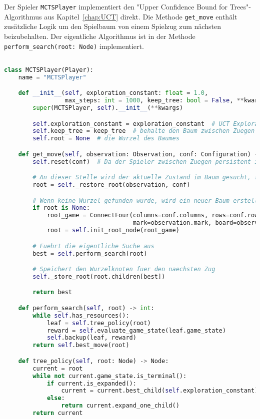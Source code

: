 Der Spieler \verb|MCTSPlayer| implementiert den "Upper Confidence Bound for Trees"-Algorithmus aus Kapitel~\ref{chap:UCT} direkt.
Die Methode \verb|get_move| enthält zusätzliche Logik um den Spielbaum von einem Spielzug zum nächsten beizubehalten.
Der eigentliche Algorithmus ist in der Methode \verb|perform_search(root: Node)| implementiert.

\begin{lstlisting}[language=Python,caption=Die MCTSPlayer Klasse,label={lst:mcts-player}]

class MCTSPlayer(Player):
    name = "MCTSPlayer"

    def __init__(self, exploration_constant: float = 1.0,
                 max_steps: int = 1000, keep_tree: bool = False, **kwargs):
        super(MCTSPlayer, self).__init__(**kwargs)

        self.exploration_constant = exploration_constant  # UCT Exploration Konstante Cp
        self.keep_tree = keep_tree  # behalte den Baum zwischen Zuegen
        self.root = None  # die Wurzel des Baumes

    def get_move(self, observation: Observation, conf: Configuration) -> int:
        self.reset(conf)  # Da der Spieler zwischen Zuegen persistent ist, koennen hier Variablen pro Zug zurueckgesetzt werden

        # An dieser Stelle wird der aktuelle Zustand im Baum gesucht, falls der Baum zwischen Zuegen erhalten bleibt
        root = self._restore_root(observation, conf)

        # Wenn keine Wurzel gefunden wurde, wird ein neuer Baum erstellt
        if root is None:
            root_game = ConnectFour(columns=conf.columns, rows=conf.rows, inarow=conf.inarow,
                                    mark=observation.mark, board=observation.board)
            root = self.init_root_node(root_game)

        # Fuehrt die eigentliche Suche aus
        best = self.perform_search(root)

        # Speichert den Wurzelknoten fuer den naechsten Zug
        self._store_root(root.children[best])

        return best

    def perform_search(self, root) -> int:
        while self.has_resources():
            leaf = self.tree_policy(root)
            reward = self.evaluate_game_state(leaf.game_state)
            self.backup(leaf, reward)
        return self.best_move(root)

    def tree_policy(self, root: Node) -> Node:
        current = root
        while not current.game_state.is_terminal():
            if current.is_expanded():
                current = current.best_child(self.exploration_constant)
            else:
                return current.expand_one_child()
        return current


\end{lstlisting}
